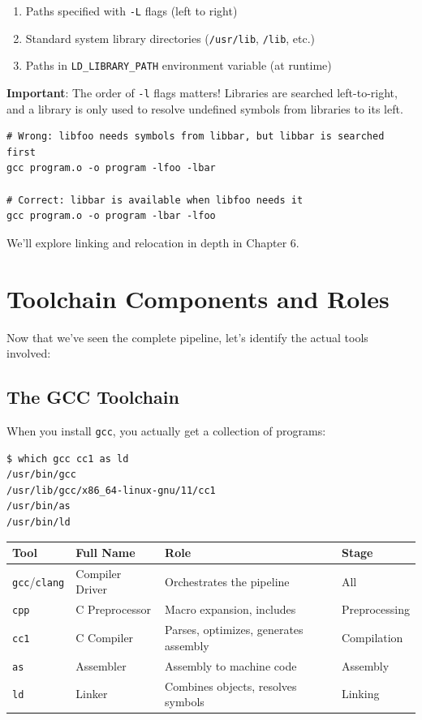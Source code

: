 \begin{enumerate}
    \item Paths specified with \texttt{-L} flags (left to right)
    \item Standard system library directories (\texttt{/usr/lib}, \texttt{/lib}, etc.)
    \item Paths in \texttt{LD\_LIBRARY\_PATH} environment variable (at runtime)
\end{enumerate}

\textbf{Important}: The order of \texttt{-l} flags matters! Libraries are searched left-to-right, and a library is only used to resolve undefined symbols from libraries to its left.

\begin{verbatim}
# Wrong: libfoo needs symbols from libbar, but libbar is searched first
gcc program.o -o program -lfoo -lbar

# Correct: libbar is available when libfoo needs it
gcc program.o -o program -lbar -lfoo
\end{verbatim}

We'll explore linking and relocation in depth in Chapter 6.

\section{Toolchain Components and Roles}

Now that we've seen the complete pipeline, let's identify the actual tools involved:

\subsection{The GCC Toolchain}

When you install \texttt{gcc}, you actually get a collection of programs:

\begin{verbatim}
$ which gcc cc1 as ld
/usr/bin/gcc
/usr/lib/gcc/x86_64-linux-gnu/11/cc1
/usr/bin/as
/usr/bin/ld
\end{verbatim}

\begin{center}
\begin{tabular}{|l|l|l|l|}
\hline
\textbf{Tool} & \textbf{Full Name} & \textbf{Role} & \textbf{Stage} \\
\hline
\texttt{gcc}/\texttt{clang} & Compiler Driver & Orchestrates the pipeline & All \\
\hline
\texttt{cpp} & C Preprocessor & Macro expansion, includes & Preprocessing \\
\hline
\texttt{cc1} & C Compiler & Parses, optimizes, generates assembly & Compilation \\
\hline
\texttt{as} & Assembler & Assembly to machine code & Assembly \\
\hline
\texttt{ld} & Linker & Combines objects, resolves symbols & Linking \\
\hline
\end{tabular}
\end{center}

